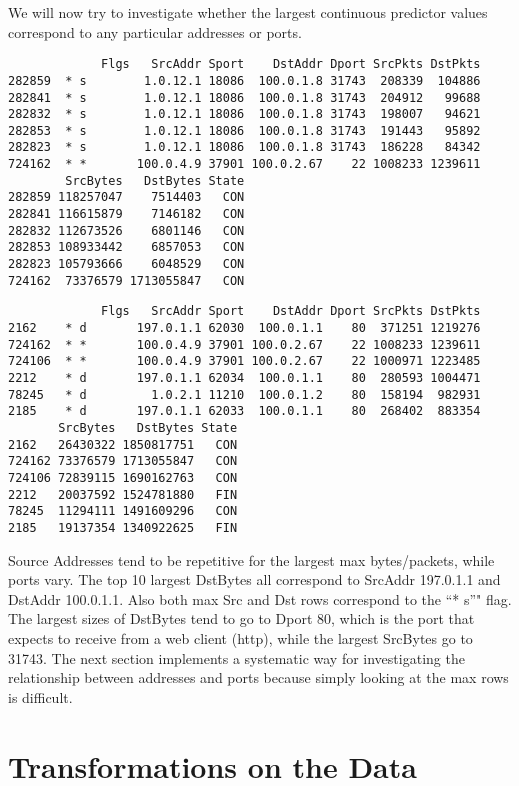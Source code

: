 \documentclass[12pt,twoside]{dukestatscithesis}
\theoremstyle{definition}
\theoremstyle{definition}
\theoremstyle{definition}
\theoremstyle{remark}
\begin{document}
We will now try to investigate whether the largest continuous predictor
values correspond to any particular addresses or ports.
\begin{verbatim}
             Flgs   SrcAddr Sport    DstAddr Dport SrcPkts DstPkts
282859  * s        1.0.12.1 18086  100.0.1.8 31743  208339  104886
282841  * s        1.0.12.1 18086  100.0.1.8 31743  204912   99688
282832  * s        1.0.12.1 18086  100.0.1.8 31743  198007   94621
282853  * s        1.0.12.1 18086  100.0.1.8 31743  191443   95892
282823  * s        1.0.12.1 18086  100.0.1.8 31743  186228   84342
724162  * *       100.0.4.9 37901 100.0.2.67    22 1008233 1239611
        SrcBytes   DstBytes State
282859 118257047    7514403   CON
282841 116615879    7146182   CON
282832 112673526    6801146   CON
282853 108933442    6857053   CON
282823 105793666    6048529   CON
724162  73376579 1713055847   CON
\end{verbatim}
\begin{verbatim}
             Flgs   SrcAddr Sport    DstAddr Dport SrcPkts DstPkts
2162    * d       197.0.1.1 62030  100.0.1.1    80  371251 1219276
724162  * *       100.0.4.9 37901 100.0.2.67    22 1008233 1239611
724106  * *       100.0.4.9 37901 100.0.2.67    22 1000971 1223485
2212    * d       197.0.1.1 62034  100.0.1.1    80  280593 1004471
78245   * d         1.0.2.1 11210  100.0.1.2    80  158194  982931
2185    * d       197.0.1.1 62033  100.0.1.1    80  268402  883354
       SrcBytes   DstBytes State
2162   26430322 1850817751   CON
724162 73376579 1713055847   CON
724106 72839115 1690162763   CON
2212   20037592 1524781880   FIN
78245  11294111 1491609296   CON
2185   19137354 1340922625   FIN
\end{verbatim}
Source Addresses tend to be repetitive for the largest max
bytes/packets, while ports vary. The top 10 largest DstBytes all
correspond to SrcAddr 197.0.1.1 and DstAddr 100.0.1.1. Also both max Src
and Dst rows correspond to the ``* s''" flag. The largest sizes of
DstBytes tend to go to Dport 80, which is the port that expects to
receive from a web client (http), while the largest SrcBytes go to
31743. The next section implements a systematic way for investigating
the relationship between addresses and ports because simply looking at
the max rows is difficult.

\section{Transformations on the Data}\label{transformations-on-the-data}
\end{document}
